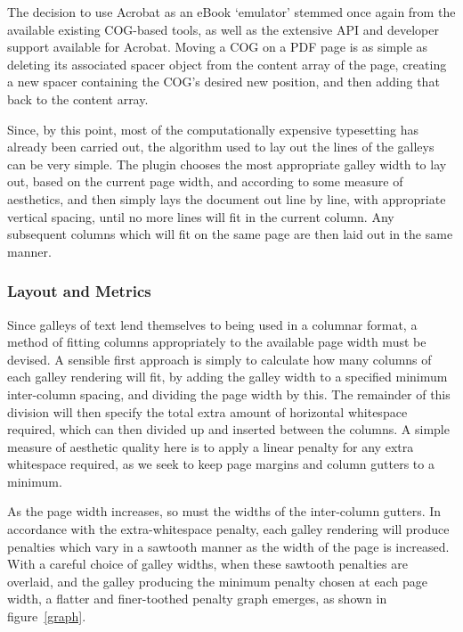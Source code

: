 \documentclass{sig-alternate}
\begin{document}
The decision to use Acrobat as an eBook `emulator' stemmed once again from the available existing COG-based tools, as well as the extensive API and developer support available for Acrobat. Moving a COG on a PDF page is as simple as deleting its associated spacer object from the content array of the page, creating a new spacer containing the COG's desired new position, and then adding that back to the content array.

Since, by this point, most of the computationally expensive typesetting has already been carried out, the algorithm used to lay out the lines of the galleys can be very simple. The plugin chooses the most appropriate galley width to lay out, based on the current page width, and according to some measure of aesthetics, and then simply lays the document out line by line, with appropriate vertical spacing, until no more lines will fit in the current column. Any subsequent columns which will fit on the same page are then laid out in the same manner.


\subsubsection{Layout and Metrics}


Since galleys of text lend themselves to being used in a columnar format, a method of fitting columns appropriately to the available page width must be devised. A sensible first approach is simply to calculate how many columns of each galley rendering will fit, by adding the galley width to a specified minimum inter-column spacing, and dividing the page width by this. The remainder of this division will then specify the total extra amount of horizontal whitespace required, which can then divided up and inserted between the columns. A simple measure of aesthetic quality here is to apply a linear penalty for any extra whitespace required, as we seek to keep page margins and column gutters to a minimum.

As the page width increases, so must the widths of the inter-column gutters. In accordance with the extra-whitespace penalty, each galley rendering will produce penalties which vary in a sawtooth manner as the width of the page is increased. With a careful choice of galley widths, when these sawtooth penalties are overlaid, and the galley producing the minimum penalty chosen at each page width, a flatter and finer-toothed penalty graph emerges, as shown in figure~\ref{graph}.
\end{document}

